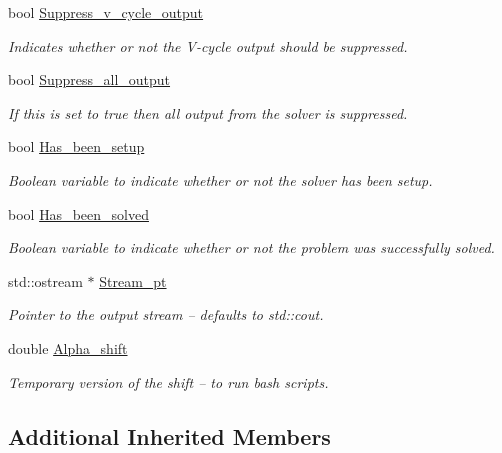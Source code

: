 \begin{DoxyCompactItemize}
bool \hyperlink{classoomph_1_1HelmholtzMGPreconditioner_a7d2d22a686e109645a7e2fb39f3de704}{Suppress\+\_\+v\+\_\+cycle\+\_\+output}
\begin{DoxyCompactList}\small\item\em Indicates whether or not the V-\/cycle output should be suppressed. \end{DoxyCompactList}\item 
bool \hyperlink{classoomph_1_1HelmholtzMGPreconditioner_acfa013d5b84d1e611c9c2514aedd71cc}{Suppress\+\_\+all\+\_\+output}
\begin{DoxyCompactList}\small\item\em If this is set to true then all output from the solver is suppressed. \end{DoxyCompactList}\item 
bool \hyperlink{classoomph_1_1HelmholtzMGPreconditioner_a5f55a8429e948ec42cad90add3b74488}{Has\+\_\+been\+\_\+setup}
\begin{DoxyCompactList}\small\item\em Boolean variable to indicate whether or not the solver has been setup. \end{DoxyCompactList}\item 
bool \hyperlink{classoomph_1_1HelmholtzMGPreconditioner_ad388b2b7f4f099f5bc478dfc7088c1a2}{Has\+\_\+been\+\_\+solved}
\begin{DoxyCompactList}\small\item\em Boolean variable to indicate whether or not the problem was successfully solved. \end{DoxyCompactList}\item 
std\+::ostream $\ast$ \hyperlink{classoomph_1_1HelmholtzMGPreconditioner_ab6fb66075019d6d68be33e2dc8332d83}{Stream\+\_\+pt}
\begin{DoxyCompactList}\small\item\em Pointer to the output stream -- defaults to std\+::cout. \end{DoxyCompactList}\item 
double \hyperlink{classoomph_1_1HelmholtzMGPreconditioner_a99ced707bfbb8f6d0428419675236879}{Alpha\+\_\+shift}
\begin{DoxyCompactList}\small\item\em Temporary version of the shift -- to run bash scripts. \end{DoxyCompactList}\end{DoxyCompactItemize}
\subsection*{Additional Inherited Members}


